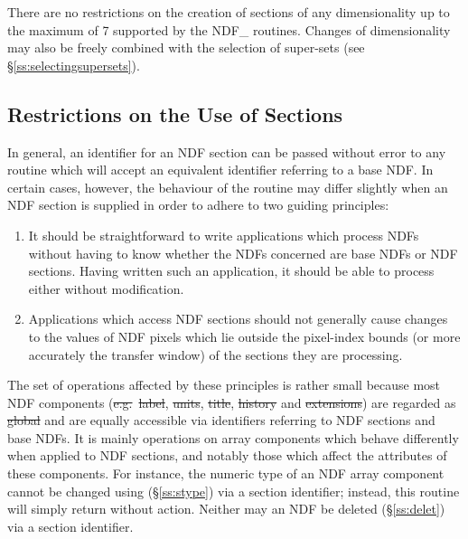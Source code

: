 There are no restrictions on the creation of sections of any dimensionality
up to the maximum of 7 supported by the NDF\_ routines.
Changes of dimensionality may also be freely combined with the selection of
super-sets (see \S\ref{ss:selectingsupersets}).

\subsection{\label{ss:sectionrestrictions}Restrictions on the Use of Sections}

In general, an identifier for an NDF section can be passed without error to
any routine which will accept an equivalent identifier referring to a base
NDF. 
In certain cases, however, the behaviour of the routine may differ slightly
when an NDF section is supplied in order to adhere to two guiding
principles: 

\begin{enumerate}

\item
It should be straightforward to write applications which process NDFs without
having to know whether the NDFs concerned are base NDFs or NDF sections. 
Having written such an application, it should be able to process either without
modification. 

\item
Applications which access NDF sections should not generally cause changes to the
values of NDF pixels which lie outside the pixel-index bounds (or more
accurately the transfer window) of the sections they are processing. 

\end{enumerate}

The set of operations affected by these principles is rather small because
most NDF components (\st{e.g.}\ \st{label}, \st{units}, \st{title},
\st{history\/} and \st{extensions\/}) are regarded as \st{global\/}
and are equally 
accessible via identifiers referring to NDF sections and base NDFs. 
It is mainly operations on array components which behave differently when
applied to NDF sections, and notably those which affect the attributes of
these components. 
For instance, the numeric type of an NDF array component cannot be changed
using  (\S\ref{ss:stype}) via a section identifier; instead, this
routine will simply return without action. 
Neither may an NDF be deleted (\S\ref{ss:delet}) via a section identifier.

